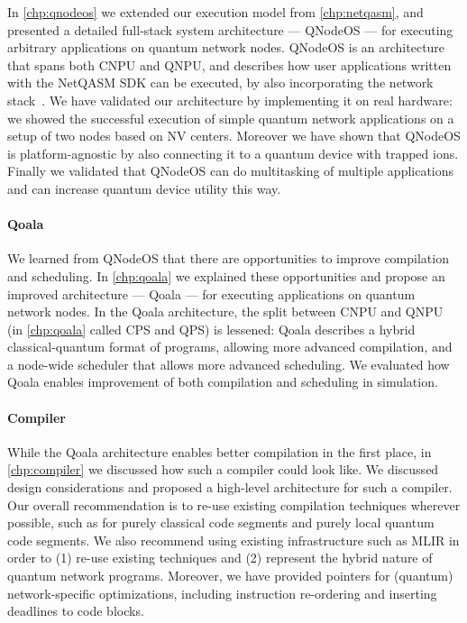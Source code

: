 In \cref{chp:qnodeos} we extended our execution model from \cref{chp:netqasm}, and presented a detailed full-stack system architecture --- QNodeOS --- for executing arbitrary applications on quantum network nodes.
QNodeOS is an architecture that spans both CNPU and QNPU, and describes how user applications written with the NetQASM SDK can be executed, by also incorporating the network stack~\cite{dahlberg2019linklayer,kozlowski2020networklayer}.
We have validated our architecture by implementing it on real hardware: we showed the successful execution of simple quantum network applications on a setup of two nodes based on NV centers.
Moreover we have shown that QNodeOS is platform-agnostic by also connecting it to a quantum device with trapped ions.
Finally we validated that QNodeOS can do multitasking of multiple applications and can increase quantum device utility this way.

\paragraph{Qoala}
We learned from QNodeOS that there are opportunities to improve compilation and scheduling.
In \cref{chp:qoala} we explained these opportunities and propose an improved architecture --- Qoala --- for executing applications on quantum network nodes.
In the Qoala architecture, the split between CNPU and QNPU (in \cref{chp:qoala} called CPS and QPS) is lessened: Qoala describes a hybrid classical-quantum format of programs, allowing more advanced compilation, and a node-wide scheduler that allows more advanced scheduling.
We evaluated how Qoala enables improvement of both compilation and scheduling in simulation.

\paragraph{Compiler}
While the Qoala architecture enables better compilation in the first place, in \cref{chp:compiler} we discussed how such a compiler could look like.
We discussed design considerations and proposed a high-level architecture for such a compiler.
Our overall recommendation is to re-use existing compilation techniques wherever possible, such as for purely classical code segments and purely local quantum code segments.
We also recommend using existing infrastructure such as MLIR in order to (1) re-use existing techniques and (2) represent the hybrid nature of quantum network programs.
Moreover, we have provided pointers for (quantum) network-specific optimizations, including instruction re-ordering and inserting deadlines to code blocks.





